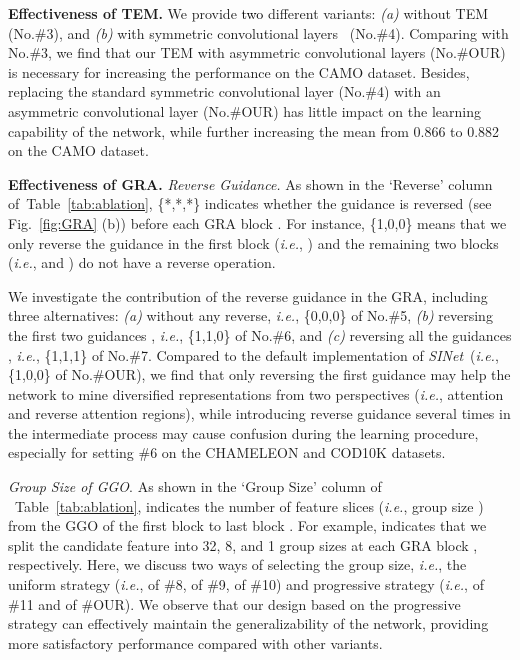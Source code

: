 \documentclass[10pt,journal,compsoc]{IEEEtran}
\def\ie{\emph{i.e.}}
\newcommand{\myPara}[1]{\vspace{6pt}\noindent\textbf{#1}\qquad }
\newcommand{\figref}[1]{Fig.~\ref{#1}}
\newcommand{\tabref}[1]{Table~\ref{#1}}
\newcommand{\Rev}[1]{\textcolor{black}{#1}}
\def\ournewmodel{\emph{SINet}}
\begin{document}
\myPara{Effectiveness of TEM.}
We provide \Rev{two} different variants:
\textit{(a)} without TEM (No.\#3), and
\textit{(b)} with symmetric convolutional layers~\cite{szegedy2016rethinking}  
(No.\#4).
Comparing with No.\#3, we find that our TEM with asymmetric convolutional 
layers (No.\#OUR) is necessary for 
increasing the performance on the CAMO dataset.
Besides, replacing the standard symmetric convolutional layer (No.\#4) 
with an asymmetric convolutional layer (No.\#OUR) has little impact 
on the learning capability of the network, 
while further increasing the mean  from 0.866 to 0.882 on the 
CAMO dataset. 


\myPara{Effectiveness of GRA.}
\textit{Reverse Guidance.} 
As shown in the `Reverse' column of~\tabref{tab:ablation}, \{*,*,*\} 
indicates whether the guidance is reversed (see \figref{fig:GRA} (b)) 
before each GRA block .
For instance, \{1,0,0\} means that we only reverse the guidance in the first 
block (\ie, ) and the remaining two blocks (\ie,  and ) 
do not have a reverse operation.


We investigate the contribution of the reverse guidance in the GRA, 
including three alternatives:
\textit{(a)} without any reverse, \ie, \{0,0,0\} of No.\#5, 
\textit{(b)} reversing the first two guidances , 
\ie, \{1,1,0\} of No.\#6, and 
\textit{(c)} reversing all the guidances , 
\ie, \{1,1,1\} of No.\#7. 
Compared to the default implementation of \ournewmodel~(\ie, \{1,0,0\} 
of No.\#OUR), 
we find that only reversing the first guidance may help the network 
to mine diversified representations from two perspectives 
(\ie, attention and reverse attention regions), 
while introducing reverse guidance several times in the intermediate process 
may cause confusion during the learning procedure, 
especially for setting \#6 on the CHAMELEON and COD10K datasets.


\textit{Group Size of GGO}.
As shown in the `Group Size' column of ~\tabref{tab:ablation}, 
 indicates the number of feature slices (\ie, group size ) 
from the GGO of the first block  to last block .
For example,  indicates that we split the candidate feature 
 into 32, 8, and 1 group sizes at each GRA block 
, respectively. 
Here, we discuss two ways of selecting the group size, \ie, 
the uniform strategy (\ie,  of \#8,  of \#9, 
 of \#10) and progressive strategy (\ie,  of \#11 
and  of \#OUR).
We observe that our design based on the progressive strategy can effectively 
maintain the generalizability of the network, 
providing more satisfactory performance compared with other variants.
\end{document}
